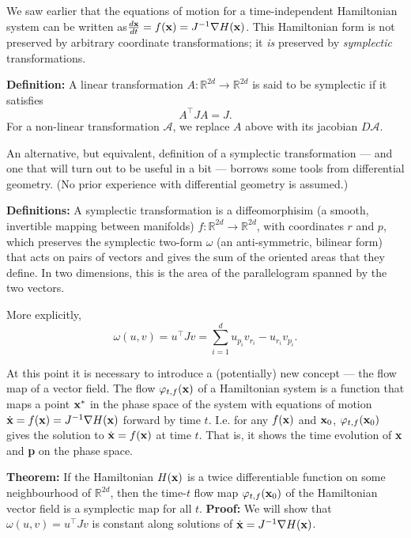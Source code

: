 \documentclass{article}
\begin{document}
We saw earlier that the equations of motion for a time-independent Hamiltonian system can be written as$ \frac{d{\bf x}}{dt} = f({\bf x}) = J^{-1}\nabla H({\bf x})$. This Hamiltonian form is not preserved by arbitrary coordinate transformations; it \emph{is} preserved by \emph{symplectic} transformations.

{\bf Definition:} A linear transformation $A: \mathbb{R}^{2d}\rightarrow\mathbb{R}^{2d}$ is said to be symplectic if it satisfies
$$ A^\top J A = J.$$
For a non-linear transformation $\mathcal{A}$, we replace $A$ above with its jacobian $D\mathcal{A}$.

An alternative, but equivalent, definition of a symplectic transformation --- and one that will turn out to be useful in a bit --- borrows some tools from differential geometry. (No prior experience with differential geometry is assumed.)

{\bf Definitions:} A symplectic transformation is a diffeomorphisim (a smooth, invertible mapping between manifolds) $f:\mathbb{R}^{2d}\rightarrow\mathbb{R}^{2d}$, with coordinates $r$ and $p$, which preserves the symplectic two-form $\omega$ (an anti-symmetric, bilinear form) that acts on pairs of vectors and gives the sum of the oriented areas that they define. In two dimensions, this is the area of the parallelogram spanned by the two vectors.

More explicitly,
\begin{equation*}
	\omega(u,v) = u^\top Jv = \sum_{i=1}^d u_{p_i} v_{r_i} - u_{r_i} v_{p_i}.
\end{equation*}

At this point it is necessary to introduce a (potentially) new concept --- the flow map of a vector field. The flow $\varphi_{t,f}({\bf x})$ of a Hamiltonian system is a function that maps a point ${\bf x}^*$ in the phase space of the system with equations of motion $\dot{\bf x} = f({\bf x}) =J^{-1}\nabla H({\bf x})$ forward by time $t$. I.e. for any $f({\bf x})$ and ${\bf x}_0$, $\varphi_{t,f}({\bf x}_0)$ gives the solution to $\dot{\bf x}=f({\bf x})$ at time $t$. That is, it shows the time evolution of {\bf x} and {\bf p} on the phase space.

{\bf Theorem:} If the Hamiltonian $H({\bf x})$ is a twice differentiable function on some neighbourhood of $\mathbb{R}^{2d}$, then the time-$t$ flow map $\varphi_{t,f}({\bf x}_0)$ of the Hamiltonian vector field is a symplectic map for all $t$.
{\bf Proof:} We will show that $\omega(u,v)=u^\top J v$ is constant along solutions of $\dot{\bf x} = J^{-1}\nabla H({\bf x})$.
\end{document}
